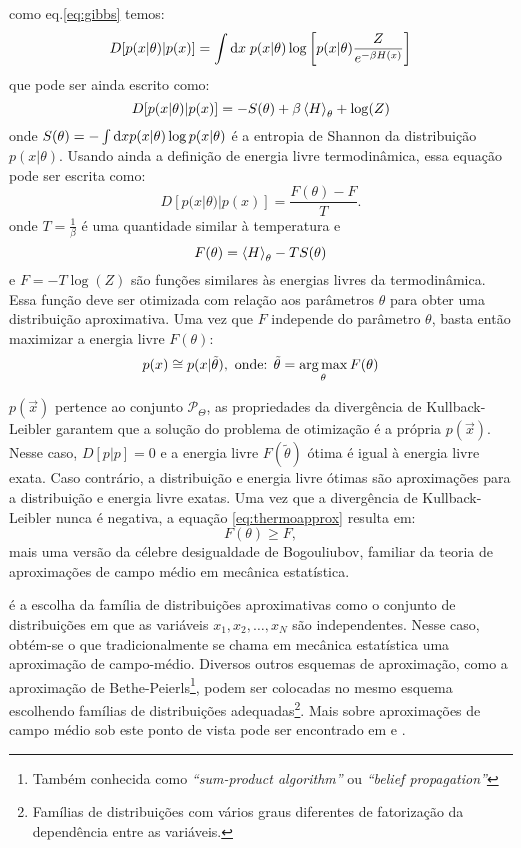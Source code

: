  como eq.\eqref{eq:gibbs} temos:
\begin{equation*}
 D[ p(x|\theta)|p(x) ] = \int \mathrm{d} x\; p(x|\theta) \log\left[p(x|\theta)\frac{Z}{e^{-\beta H(x)}}\right]
\end{equation*}
que pode ser ainda escrito como:
\[
 D[ p(x|\theta)|p(x) ] = - S(\theta)  + \beta \left\langle H \right\rangle_{\theta}  + \log(Z)
\]
onde $S(\theta) = - \int \mathrm{d} x p(x|\theta) \log p(x|\theta)$ é a entropia de Shannon da distribuição $p(x|\theta)$. Usando ainda a definição de energia livre termodinâmica, essa equação pode ser escrita como:
\begin{equation}
\label{eq:thermoapprox}
 D[ p(x|\theta)|p(x) ] = \dfrac{F(\theta) - F}{T}.
\end{equation}
onde $T = \frac{1}{\beta}$ é uma quantidade similar à temperatura e 
\begin{equation}
\label{eq:freenergy}
F(\theta) = \avg{H}_{\theta} - T S(\theta) 
\end{equation}
e $F = -T\log(Z)$ são funções similares às energias livres da termodinâmica. Essa função deve ser otimizada com relação aos parâmetros $\theta$ para obter uma distribuição aproximativa. Uma vez que $F$ independe do parâmetro $\theta$, basta então maximizar a energia livre $F(\theta)$:
\begin{equation}
p(x) \cong p(x | \tilde{\theta}), \text{   onde: } \tilde{\theta} = \operatorname*{arg\,max}_{\theta} F(\theta)
\end{equation}

 $p(\vec{x})$ pertence ao conjunto $\mathcal{P}_\Theta$, as propriedades da divergência de Kullback-Leibler garantem que a solução do problema de otimização é a própria $p(\vec{x})$. Nesse caso, $D[p|p] = 0$ e a energia livre $F(\tilde{\theta})$ ótima é igual à energia livre exata. Caso contrário, a distribuição e energia livre ótimas são aproximações para a distribuição e energia livre exatas. Uma vez que a divergência de Kullback-Leibler nunca é negativa, a equação \eqref{eq:thermoapprox} resulta em:
\begin{equation}
 \label{eq:bogouliubov}
  F(\theta) \ge F,
\end{equation}
mais uma versão da célebre desigualdade de Bogouliubov, familiar da teoria de aproximações de campo médio em mecânica estatística\cite{Salinas1997}.

 é a escolha da família de distribuições aproximativas como o conjunto de distribuições em que as variáveis $x_1, x_2, \ldots, x_N$ são independentes. Nesse caso, obtém-se o que tradicionalmente se chama em mecânica estatística uma aproximação de campo-médio. Diversos outros esquemas de aproximação, como a aproximação de Bethe-Peierls\footnote{Também conhecida como \emph{``sum-product algorithm''} ou \emph{``belief propagation''}}, podem ser colocadas no mesmo esquema escolhendo famílias de distribuições adequadas\footnote{Famílias de distribuições com vários graus diferentes de fatorização da dependência entre as variáveis.}. Mais sobre aproximações de campo médio sob este ponto de vista pode ser encontrado em \citet{Opper2001}\cite{Opper2001} e \citet{Mezard2009}\cite{Mezard2009}.

